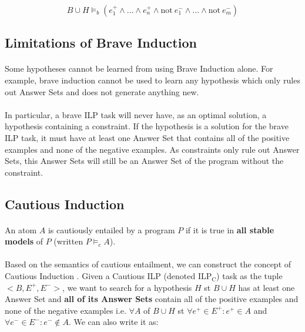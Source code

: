 \documentclass{article}
\theoremstyle{plain}
\theoremstyle{definition}
\begin{document}
\begin{multicols}{2}
$$B \cup H \models_b (e_1^+ \land ... \land e_n^+ \land \text{not}\ e_1^- \land ...  \land \text{not}\ e_m^-)$$

\subsection{Limitations of Brave Induction}

\paragraph{} Some hypotheses cannot be learned from using Brave Induction alone. For example, brave induction cannot be used to learn any hypothesis which only rules out Answer Sets and does not generate anything new.

\paragraph{} In particular, a brave ILP task will never have, as an optimal solution, a hypothesis containing a constraint. If the hypothesis is a solution for the brave ILP task, it must have at least one Answer Set that contains all of the positive examples and none of the negative examples. As constraints only rule out Answer Sets, this Answer Sets will still be an Answer Set of the program without the constraint.

\subsection{Cautious Induction}
\paragraph{} An atom $A$ is cautiously entailed by a program $P$ if it is true in \textbf{all stable models} of $P$ (written $P \models_c A$).

\paragraph{} Based on the semantics of cautious entailment, we can construct the concept of Cautious Induction  \cite{sakama08}. Given a Cautious ILP (denoted $\text{ILP}_\text{C}$) task as the tuple $<B, E^+, E^->$, we want to search for a hypothesis $H$ st $B \cup H$ has at least one Answer Set and \textbf{all of its Answer Sets} contain all of the positive examples and none of the negative examples i.e. $\forall A$ of $B \cup H$ st $\forall e^+ \in E^+: e^+ \in A$ and $\forall e^- \in E^-: e^- \not\in A$. We can also write it as:


\end{multicols}
\end{document}
